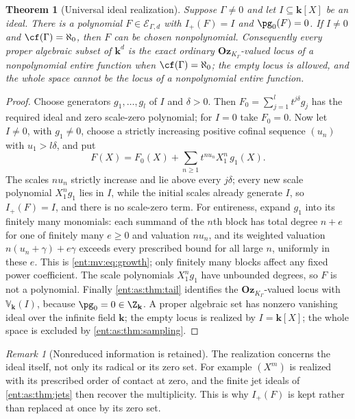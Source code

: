 \documentclass[11pt]{article}
\newtheorem{theorem}{Theorem}[section]
\theoremstyle{plain}
\theoremstyle{plain}
\theoremstyle{plain}
\theoremstyle{definition}
\theoremstyle{definition}
\theoremstyle{definition}
\theoremstyle{definition}
\theoremstyle{remark}
\newtheorem{remark}[remark]{Remark}
\newcommand{\K}{K_\Gamma}\newcommand{\KD}{K_\Delta}
\newcommand{\kk}{\mathbf k}\newcommand{\PP}{\mathbb P}
\newcommand{\Oz}{\mathbf{Oz}}\newcommand{\Ed}{\mathcal E_{\Gamma,d}}
\newcommand{\Zk}{\Z_{\kk}}\newcommand{\OzK}{\Oz_{\K}}
\begin{document}
\begin{theorem}[Universal ideal realization]\label{ent:as:thm:realization}
Suppose $\Gamma\ne0$ and let $I\subseteq\kk[X]$ be an ideal. There is a
polynomial $F\in\Ed$ with $I_+(F)=I$ and $\pg_0(F)=0$. If $I\ne0$ and
$\cf(\Gamma)=\aleph_0$, then $F$ can be chosen nonpolynomial. Consequently
every proper algebraic subset of $\kk^d$ is the exact ordinary $\OzK$-valued
locus of a nonpolynomial entire function when $\cf(\Gamma)=\aleph_0$; the empty
locus is allowed, and the whole space cannot be the locus of a nonpolynomial
entire function.
\end{theorem}
\begin{proof}
Choose generators $g_1,\ldots,g_l$ of $I$ and $\delta>0$. Then
$F_0=\sum_{j=1}^lt^{j\delta}g_j$ has the required ideal and zero scale-zero
polynomial; for $I=0$ take $F_0=0$. Now let $I\ne0$, with $g_1\ne0$, choose a
strictly increasing positive cofinal sequence $(u_n)$ with $u_1>l\delta$, and
put
\begin{equation}\label{ent:as:eq:realization}
 F(X)=F_0(X)+\sum_{n\ge1}t^{nu_n}X_1^n\,g_1(X).
\end{equation}
The scales $nu_n$ strictly increase and lie above every $j\delta$; every new
scale polynomial $X_1^ng_1$ lies in $I$, while the initial scales already
generate $I$, so $I_+(F)=I$, and there is no scale-zero term. For entireness,
expand $g_1$ into its finitely many monomials: each summand of the $n$th block
has total degree $n+e$ for one of finitely many $e\ge0$ and valuation $nu_n$,
and its weighted valuation $n(u_n+\gamma)+e\gamma$ exceeds every prescribed
bound for all large $n$, uniformly in these $e$. This is
\eqref{ent:mv:eq:growth}; only finitely many blocks affect any fixed power
coefficient. The scale polynomials $X_1^ng_1$ have unbounded degrees, so $F$ is
not a polynomial. Finally \cref{ent:as:thm:tail} identifies the $\OzK$-valued
locus with $\mathbb V_\kk(I)$, because $\pg_0=0\in\Zk$. A proper algebraic set
has nonzero vanishing ideal over the infinite field $\kk$; the empty locus is
realized by $I=\kk[X]$; the whole space is excluded by
\cref{ent:as:thm:sampling}.
\end{proof}

\begin{remark}[Nonreduced information is retained]\label{ent:as:rem:nonreduced}
The realization concerns the ideal itself, not only its radical or its zero
set. For example $(X^m)$ is realized with its prescribed order of contact at
zero, and the finite jet ideals of \cref{ent:as:thm:jets} then recover the
multiplicity. This is why $I_+(F)$ is kept rather than replaced at once by its
zero set.
\end{remark}
\end{document}
